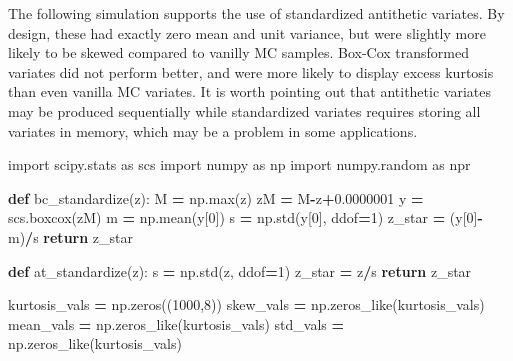 \documentclass[
]{book}
\newenvironment{Shaded}{\begin{snugshade}}{\end{snugshade}}
\newcommand{\BuiltInTok}[1]{#1}
\newcommand{\ControlFlowTok}[1]{\textcolor[rgb]{0.13,0.29,0.53}{\textbf{#1}}}
\newcommand{\DecValTok}[1]{\textcolor[rgb]{0.00,0.00,0.81}{#1}}
\newcommand{\FloatTok}[1]{\textcolor[rgb]{0.00,0.00,0.81}{#1}}
\newcommand{\ImportTok}[1]{#1}
\newcommand{\KeywordTok}[1]{\textcolor[rgb]{0.13,0.29,0.53}{\textbf{#1}}}
\newcommand{\NormalTok}[1]{#1}
\newcommand{\OperatorTok}[1]{\textcolor[rgb]{0.81,0.36,0.00}{\textbf{#1}}}
\begin{document}
The following simulation supports the use of standardized antithetic variates. By design, these had exactly zero mean and unit variance, but were slightly more likely to be skewed compared to vanilly MC samples. Box-Cox transformed variates did not perform better, and were more likely to display excess kurtosis than even vanilla MC variates. It is worth pointing out that antithetic variates may be produced sequentially while standardized variates requires storing all variates in memory, which may be a problem in some applications.

\begin{Shaded}
\begin{Highlighting}[]
\ImportTok{import}\NormalTok{ scipy.stats  }\ImportTok{as}\NormalTok{ scs}
\ImportTok{import}\NormalTok{ numpy  }\ImportTok{as}\NormalTok{ np}
\ImportTok{import}\NormalTok{ numpy.random  }\ImportTok{as}\NormalTok{ npr}

\KeywordTok{def}\NormalTok{ bc\_standardize(z):}
\NormalTok{  M }\OperatorTok{=}\NormalTok{ np.}\BuiltInTok{max}\NormalTok{(z)}
\NormalTok{  zM }\OperatorTok{=}\NormalTok{ M}\OperatorTok{{-}}\NormalTok{z}\OperatorTok{+}\FloatTok{0.0000001}
\NormalTok{  y }\OperatorTok{=}\NormalTok{ scs.boxcox(zM)}
\NormalTok{  m }\OperatorTok{=}\NormalTok{ np.mean(y[}\DecValTok{0}\NormalTok{])}
\NormalTok{  s }\OperatorTok{=}\NormalTok{ np.std(y[}\DecValTok{0}\NormalTok{], ddof}\OperatorTok{=}\DecValTok{1}\NormalTok{)}
\NormalTok{  z\_star }\OperatorTok{=}\NormalTok{ (y[}\DecValTok{0}\NormalTok{]}\OperatorTok{{-}}\NormalTok{m)}\OperatorTok{/}\NormalTok{s}
  \ControlFlowTok{return}\NormalTok{ z\_star}

\KeywordTok{def}\NormalTok{ at\_standardize(z):}
\NormalTok{  s }\OperatorTok{=}\NormalTok{ np.std(z, ddof}\OperatorTok{=}\DecValTok{1}\NormalTok{)}
\NormalTok{  z\_star }\OperatorTok{=}\NormalTok{ z}\OperatorTok{/}\NormalTok{s}
  \ControlFlowTok{return}\NormalTok{ z\_star}

\NormalTok{kurtosis\_vals }\OperatorTok{=}\NormalTok{ np.zeros((}\DecValTok{1000}\NormalTok{,}\DecValTok{8}\NormalTok{))}
\NormalTok{skew\_vals }\OperatorTok{=}\NormalTok{ np.zeros\_like(kurtosis\_vals)}
\NormalTok{mean\_vals }\OperatorTok{=}\NormalTok{ np.zeros\_like(kurtosis\_vals)}
\NormalTok{std\_vals }\OperatorTok{=}\NormalTok{ np.zeros\_like(kurtosis\_vals)}


\end{Highlighting}
\end{Shaded}
\end{document}
